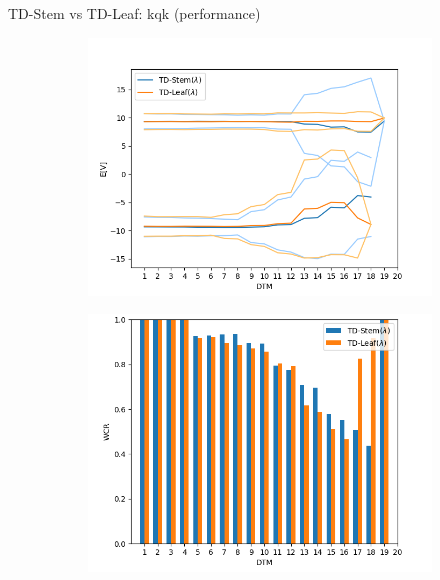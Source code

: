 \documentclass{beamer}
\begin{document}
\begin{frame}{TD-Stem vs TD-Leaf: kqk (performance)}
	\begin{figure}
		\begin{subfigure}{0.4\textwidth}
			\includegraphics[scale=0.25]{fig/plots/kqk_vf}
		\end{subfigure}
		\begin{subfigure}{0.4\textwidth}
			\includegraphics[scale=0.25]{fig/plots/kqk_wcr}
		\end{subfigure}
		\begin{subfigure}{0.4\textwidth}

\end{subfigure}
\end{figure}
\end{frame}
\end{document}
